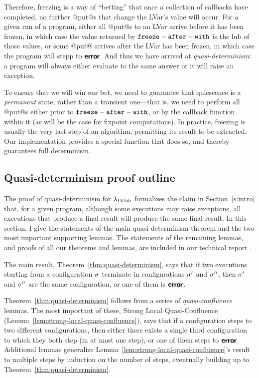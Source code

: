 \documentclass{article}
\begin{document}
Therefore, freezing is a way of ``betting'' that once a collection of
callbacks have completed, no further @put@s that change the LVar's
value will occur.  For a given run of a program, either all @put@s to
an LVar arrive before it has been frozen, in which case the value
returned by ${\mbox{\texttt{freeze}}-\mbox{\texttt{after}}-\mbox{\texttt{with}}}$ is the lub of those values, or some @put@ arrives
after the LVar has been frozen, in which case the program will stepp
to $\textbf{\textsf{error}}$.  And thus we have arrived at \emph{quasi-determinism}: a
program will always either evaluate to the same answer or it will
raise an exception.

To ensure that we will win our bet, we need to guarantee that
quiescence is a \emph{permanent} state, rather than a transient
one---that is, we need to perform all @put@s either prior to ${\mbox{\texttt{freeze}}-\mbox{\texttt{after}}-\mbox{\texttt{with}}}$,
or by the callback function within it (as will be the case for
fixpoint computations).  In practice, freezing is usually the very
last step of an algorithm, permitting its result to be extracted. Our
implementation provides a special  function
that does so, and thereby guarantees full determinism.

\subsection{Quasi-determinism proof outline}

The proof of quasi-determinism for $\lambda_{\textrm{LVish}}$ formalizes the claim
in Section~\ref{s:intro} that, for a given program, although some
executions may raise exceptions, all executions that produce a final
result will produce the same final result.  In this section, I give
the statements of the main quasi-determinism theorem and the two most
important supporting lemmas.  The statements of the remaining lemmas,
and proofs of all our theorems and lemmas, are included in our
technical report \cite{Freeze-TR}.

The main result, Theorem~\ref{thm:quasi-determinism}, says that if two
executions starting from a configuration $\sigma$ terminate in
configurations $\sigma'$ and $\sigma''$, then $\sigma'$ and $\sigma''$ are
the same configuration, or one of them is $\textbf{\textsf{error}}$.

\ThmQuasiDeterminism

\noindent Theorem~\ref{thm:quasi-determinism} follows from a series of
\emph{quasi-confluence} lemmas.  The most important of these, Strong
Local Quasi-Confluence
(Lemma~\ref{lem:strong-local-quasi-confluence}), says that if a
configuration steps to two different configurations, then either there
exists a single third configuration to which they both step (in at
most one step), or one of them steps to $\textbf{\textsf{error}}$.  Additional lemmas
generalize Lemma~\ref{lem:strong-local-quasi-confluence}'s result to
multiple steps by induction on the number of steps, eventually
building up to Theorem~\ref{thm:quasi-determinism}.
\end{document}

